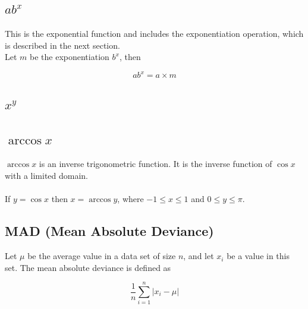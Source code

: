 \documentclass[11pt,onside]{report}
\begin{document}
\subsection{$ab^x$}
\begin{description}
This is the exponential function and includes the exponentiation operation, which is described in the next section. \\
Let $m$ be the exponentiation $b^x$, then
\end{description}
\begin{equation}
    ab^x = a\times m
\end{equation}

\subsection{$x^y$}

\subsection{$\arccos{x}$}
\begin{description}
$\arccos{x}$ is an inverse trigonometric function. It is the inverse function of $\cos{x}$ with a limited domain. \\ \\

If $y = \cos{x}$ then $x = \arccos{y}$, where $-1 \leq x \leq 1$ and $0 \leq y \leq \pi$. \cite{arccos}
\end{description}

\subsection{MAD (Mean Absolute Deviance)}
\begin{description}
Let $\mu$ be the average value in a data set of size $n$, and let $x_i$ be a value in this set. The mean absolute deviance is defined as \cite{mad}
\end{description}
\begin{equation}
    \frac{1}{n}\sum_{i=1}^{n}|x_i-\mu|
\end{equation}
\end{document}
